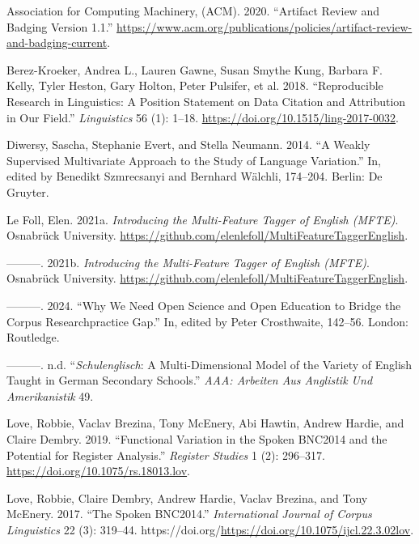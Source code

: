 \documentclass[
  letterpaper,
  DIV=11,
  numbers=noendperiod]{scrreprt}
\newlength{\cslhangindent}
\newenvironment{CSLReferences}[2] %
 {\begin{list}{}{%
  \setlength{\itemindent}{0pt}
  \setlength{\leftmargin}{0pt}
  \setlength{\parsep}{0pt}
  \ifodd #1
   \setlength{\leftmargin}{\cslhangindent}
   \setlength{\itemindent}{-1\cslhangindent}
  \fi
  \setlength{\itemsep}{#2\baselineskip}}}
 {\end{list}}
\begin{document}
\label{refs}
\begin{CSLReferences}{1}{0}
Association for Computing Machinery, (ACM). 2020. {``Artifact Review and
Badging Version 1.1.''}
\url{https://www.acm.org/publications/policies/artifact-review-and-badging-current}.

Berez-Kroeker, Andrea L., Lauren Gawne, Susan Smythe Kung, Barbara F.
Kelly, Tyler Heston, Gary Holton, Peter Pulsifer, et al. 2018.
{``Reproducible Research in Linguistics: A Position Statement on Data
Citation and Attribution in Our Field.''} \emph{Linguistics} 56 (1):
1--18. \url{https://doi.org/10.1515/ling-2017-0032}.

Diwersy, Sascha, Stephanie Evert, and Stella Neumann. 2014. {``A Weakly
Supervised Multivariate Approach to the Study of Language Variation.''}
In, edited by Benedikt Szmrecsanyi and Bernhard Wälchli, 174--204.
Berlin: De Gruyter.

Le Foll, Elen. 2021a. \emph{Introducing the Multi-Feature Tagger of
English (MFTE)}. Osnabrück University.
\url{https://github.com/elenlefoll/MultiFeatureTaggerEnglish}.

---------. 2021b. \emph{Introducing the Multi-Feature Tagger of English
(MFTE)}. Osnabrück University.
\url{https://github.com/elenlefoll/MultiFeatureTaggerEnglish}.

---------. 2024. {``Why We Need Open Science and Open Education to
Bridge the Corpus Research{\textendash}practice Gap.''} In, edited by
Peter Crosthwaite, 142--56. London: Routledge.

---------. n.d. {``{\emph{Schulenglisch}}: A Multi-Dimensional Model of
the Variety of English Taught in German Secondary Schools.''} \emph{AAA:
Arbeiten Aus Anglistik Und Amerikanistik} 49.

Love, Robbie, Vaclav Brezina, Tony McEnery, Abi Hawtin, Andrew Hardie,
and Claire Dembry. 2019. {``Functional Variation in the Spoken BNC2014
and the Potential for Register Analysis.''} \emph{Register Studies} 1
(2): 296--317. \url{https://doi.org/10.1075/rs.18013.lov}.

Love, Robbie, Claire Dembry, Andrew Hardie, Vaclav Brezina, and Tony
McEnery. 2017. {``The Spoken BNC2014.''} \emph{International Journal of
Corpus Linguistics} 22 (3): 319--44.
https://doi.org/\url{https://doi.org/10.1075/ijcl.22.3.02lov}.


\end{CSLReferences}
\end{document}
